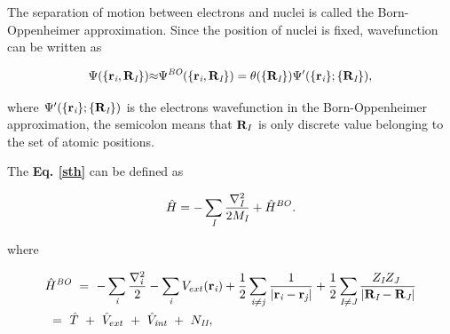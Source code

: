 \documentclass[a4paper, 12pt, titlepage,oneside,drop]{kthesis}
\begin{document}

The separation of motion between electrons and nuclei is called the Born-Oppenheimer approximation. Since the position of nuclei is fixed, wavefunction can be written as

\begin{equation}\label{nwf}
{\Psi(\{ {\textbf r}_{\textit i}, {\textbf R}_{\textit I} \})}  {\approx}  {\Psi^{ \textit{BO}} ( \{ {\textbf{r}_{\textit{i}}},\textbf{R}_{\textit I} \}) } = {\theta(\{{\textbf R}_{\textit I}\})} {\Psi'(\{\textbf{r}_{\textit i}\}; \{{\textbf R}_{\textit I}\})},
\end{equation}

where ${\Psi'(\{\textbf{r}_{\textit i}\}; \{{\textbf R}_{\textit I}\})}$  is the electrons wavefunction in the Born-Oppenheimer approximation, the semicolon means that $\textbf R_I$ is only discrete value belonging to the set of atomic positions. 
 
The \textbf{Eq. \ref{sth}} can be defined as

\begin{equation}\label{nh}
 {\hath} = - \sumi<I> \frac{{{\nabla}_{\textit{I}}^{2}}}{2 M_\textit{I}} + {\hath}^{BO}.
\end{equation}

where 

\begin{equation}\label{both}\begin{split}
&{\hath}^\textit{BO}\ =\ - \sumi<i>   \frac{{{\nabla}_{\textit{i}}^{2}}}{2}  - \sumi<i> V_{ext}(\textbf{r}_{\textit{i}})  + \frac{1}{2} \suminj<i><j> \frac{1}{ |\textbf{r}_\textit{i}-\textbf{r}_\textit{j}|} + \frac{1}{2} \suminj<I><J> \frac{Z_\textit{I} Z_\textit{J}\ }{|\textbf{R}_\textit{I}-\textbf{R}_\textit{J}|} \\
&\ = \ \hat{T} \ + \ \hat{V}_{ext} \ + \ \hat{V}_\textit{int}\ + \ N_\textit{II},
\end{split}\end{equation}
\end{document}
